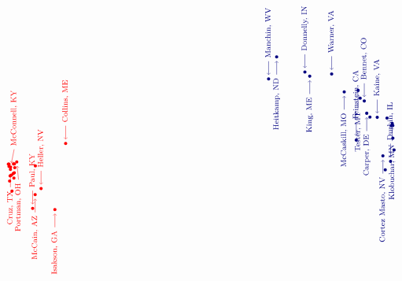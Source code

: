 \begin{equation*}
\begin{tikzpicture}[scale=0.651]
    \dataR{Blunt}{Roy}{R}{MO}{-10.456091}{0.188385}{0}
    \dataR{Hatch}{Orrin}{R}{UT}{-10.427457}{0.182143}{0}
    \dataR{Cochran}{Thad}{R}{MS}{-10.419903}{0.171741}{0}
    \dataR{Boozman}{John}{R}{AR}{-10.416449}{0.049056}{0}
    \dataR{Sasse}{Ben}{R}{NE}{-10.384081}{-0.769970}{0}
    \dataR{Moran}{Jerry}{R}{KS}{-10.354821}{-0.478472}{0}
    \dataRy{Cruz}{Ted}{R}{TX}{-10.337513}{-0.118032}{0}
    \dataRx{McConnell}{Mitch}{R}{KY}{-10.328164}{0.019018}{0.2}
    \dataR{Burr}{Richard}{R}{NC}{-10.281722}{-0.434053}{0}
    \dataR{Lee}{Mike}{R}{UT}{-10.250033}{-1.332033}{0}
    \dataR{Corker}{Bob}{R}{TN}{-10.181143}{-0.353619}{0}
    \dataR{Tillis}{Thomas}{R}{NC}{-10.164341}{0.190998}{0}
    \dataR{Alexander}{Lamar}{R}{TN}{-10.140983}{-0.605518}{0}
    \dataR{Graham}{Lindsey}{R}{SC}{-10.118998}{-0.308972}{0}
    \dataR{Young}{Todd}{R}{IN}{-10.114119}{0.195154}{0}
    \dataR{Capito}{Shelley}{R}{WV}{-10.092079}{-0.013747}{0.2}
    \dataRy{Portman}{Rob}{R}{OH}{-9.980981}{0.307914}{0.1}
    \dataRx{Paul}{Rand}{R}{KY}{-9.083156}{-2.311221}{0}
    \dataRy{McCain}{John}{R}{AZ}{-8.941401}{-1.537122}{0}
    \dataR{Murkowski}{Lisa}{R}{AK}{-8.929094}{0.087773}{0}
    \dataRx{Heller}{Dean}{R}{NV}{-8.607091}{-1.195798}{0}
    \dataRy{Isakson}{John}{R}{GA}{-7.825936}{-2.375299}{0}
    \dataRx{Collins}{Susan}{R}{ME}{-7.218464}{1.349259}{0}
    \dataDx{Manchin}{Joe}{D}{WV}{4.244339}{4.985463}{0}
    \dataDy{Heitkamp}{Heidi}{D}{ND}{4.699457}{6.230765}{0}
    \dataDx{Donnelly}{Joe}{D}{IN}{6.294362}{5.372277}{0}
    \dataDy{King}{Angus}{I}{ME}{6.567064}{5.137923}{0}
    \dataDx{Warner}{Mark}{D}{VA}{7.805257}{5.268461}{0}
    \dataDy{McCaskill}{Claire}{D}{MO}{8.515402}{4.257321}{0}
    \dataDx{Feinstein}{Dianne}{D}{CA}{9.195030}{1.541150}{0}
    \dataDy{Tester}{Jon}{D}{MT}{9.298819}{4.338771}{0}
    \dataD{Nelson}{Bill}{D}{FL}{9.415968}{3.904212}{0}
    \dataDx{Bennet}{Michael}{D}{CO}{9.648520}{3.741099}{0}
    \dataDy{Carper}{Thomas}{D}{DE}{9.787069}{3.051711}{0}
    \dataD{Coons}{Christopher}{D}{DE}{9.967535}{2.835454}{0}
    \dataDx{Kaine}{Timothy}{D}{VA}{10.380048}{2.820041}{0}
    \dataDy{Cortez Masto}{Catherine}{D}{NV}{10.700058}{0.650442}{0}
    \dataD{Menendez}{Robert}{D}{NJ}{10.833270}{-0.138012}{0}
    \dataD{Shaheen}{Jeanne}{D}{NH}{10.932457}{2.780893}{0}
    \dataDx{Durbin}{Richard}{D}{IL}{11.134223}{0.337495}{0}
    \dataD{Hassan}{Maggie}{D}{NH}{11.175503}{2.348138}{0}
    \dataDy{Klobuchar}{Amy}{D}{MN}{11.227181}{2.483025}{0}
    \dataD{Casey}{Bob}{D}{PA}{11.259986}{2.362439}{0}
    \dataD{Murphy}{Christopher}{D}{CT}{11.262853}{1.643260}{0}
    \dataD{Stabenow}{Debbie}{D}{MI}{11.331051}{0.981505}{0}

\end{tikzpicture}
\end{equation*}
